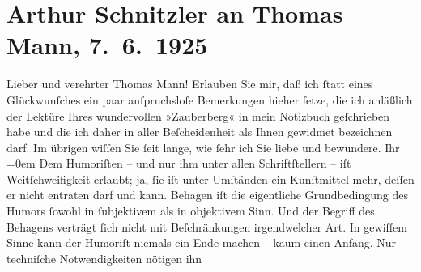 

               \section[Arthur Schnitzler an Thomas Mann, 7. 6. 1925]{ Arthur Schnitzler an Thomas Mann, 7. 6. 1925}\nopagebreak{}\rehead{ }\begin{ledgroupsized}[t]{13cm}\normalsize\beginnumbering{} \toendnotes[C]{\smallbreak\pagebreak[2]} \pstart\center{}{\pb}Lieber und verehrter Thomas Mann!\pend\pstart
           Erlauben Sie mir, daß ich ſtatt eines Glückwunſches ein paar anſpruchsloſe
               Bemerkungen hieher ſetze, die ich anläßlich der Lektüre Ihres wundervollen »Zauberberg« in mein Notizbuch geſchrieben habe
               und die ich daher in aller Beſcheidenheit als Ihnen gewidmet bezeichnen darf. Im
               übrigen wiſſen Sie ſeit lange, wie ſehr ich Sie liebe und bewundere.\pend
           \pstart
           Ihr{\\[\baselineskip]}\spacefill\mbox{}\pend
           \leftskip=0em{}\pstart
           \noindent{}Dem Humoriſten – und nur ihm unter allen Schriftſtellern – iſt Weitſchweifigkeit
                  erlaubt; ja, ſie iſt unter Umſtänden ein Kunſtmittel mehr, deſſen er nicht
                  entraten darf und kann.\pend
           \pstart
           Behagen iſt die eigentliche Grundbedingung des Humors ſowohl in ſubjektivem als in
                  objektivem Sinn. Und der Begriff des Behagens verträgt ſich nicht mit
                  Beſchränkungen irgendwelcher Art. In gewiſſem Sinne kann der Humoriſt niemals ein
                  Ende machen – kaum einen Anfang. Nur techniſche Notwendigkeiten nötigen ihn

\end{ledgroupsized}
